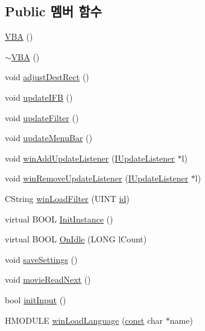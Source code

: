 \subsection*{Public 멤버 함수}
\begin{DoxyCompactItemize}
\item 
\mbox{\hyperlink{class_v_b_a_a70ffc29da53239a79cb4aab99805d0e1}{V\+BA}} ()
\item 
\mbox{\hyperlink{class_v_b_a_a601b4d3c159fde6e6232749e47af58b1}{$\sim$\+V\+BA}} ()
\item 
void \mbox{\hyperlink{class_v_b_a_acb822065cba8b15810c5a61fd05ca831}{adjust\+Dest\+Rect}} ()
\item 
void \mbox{\hyperlink{class_v_b_a_ab1caa25635cd40fc3b49b5d325cc65ef}{update\+I\+FB}} ()
\item 
void \mbox{\hyperlink{class_v_b_a_afbe0e6f9458f25adb848516537a91747}{update\+Filter}} ()
\item 
void \mbox{\hyperlink{class_v_b_a_accf3451bad473b90400193636cd27c96}{update\+Menu\+Bar}} ()
\item 
void \mbox{\hyperlink{class_v_b_a_af0712f70a90d023ab8327a366be08174}{win\+Add\+Update\+Listener}} (\mbox{\hyperlink{class_i_update_listener}{I\+Update\+Listener}} $\ast$l)
\item 
void \mbox{\hyperlink{class_v_b_a_a2d31a0656df2230310aa8dc9e3a735d3}{win\+Remove\+Update\+Listener}} (\mbox{\hyperlink{class_i_update_listener}{I\+Update\+Listener}} $\ast$l)
\item 
C\+String \mbox{\hyperlink{class_v_b_a_a228edf26b0dc4129658c174ee5a3c27c}{win\+Load\+Filter}} (U\+I\+NT \mbox{\hyperlink{_commands_8cpp_a7b7a6396b2c82ad46c6d8b2bf141a8dd}{id}})
\item 
virtual B\+O\+OL \mbox{\hyperlink{class_v_b_a_a35c73ff552824e3eba6e90393a4692d4}{Init\+Instance}} ()
\item 
virtual B\+O\+OL \mbox{\hyperlink{class_v_b_a_a0296d1fa6a340dffd47dbe623b64475c}{On\+Idle}} (L\+O\+NG l\+Count)
\item 
void \mbox{\hyperlink{class_v_b_a_aa09989acc3edb3991dc98a88655dabdb}{save\+Settings}} ()
\item 
void \mbox{\hyperlink{class_v_b_a_a0f0d982604ac77d23e7fd474c4ebbe2c}{movie\+Read\+Next}} ()
\item 
bool \mbox{\hyperlink{class_v_b_a_ac19c75e259950ddd9bb5e97d73203ebb}{init\+Input}} ()
\item 
H\+M\+O\+D\+U\+LE \mbox{\hyperlink{class_v_b_a_abbf1f3cbda50fca40ddf50a6fafe8e05}{win\+Load\+Language}} (\mbox{\hyperlink{getopt1_8c_a2c212835823e3c54a8ab6d95c652660e}{const}} char $\ast$name)

\end{DoxyCompactItemize}
